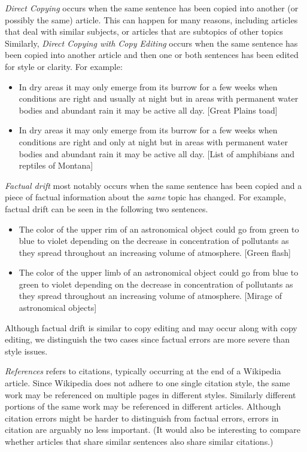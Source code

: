 \documentclass{acm_proc_article-sp}
\begin{document}
\emph{Direct Copying} occurs when the same sentence has been copied into another (or possibly the same) article. This can happen for many reasons, including articles that deal with similar subjects, or articles that are subtopics of other topics Similarly, \emph{Direct Copying with Copy Editing} occurs when the same sentence has been copied into another article and then one or both sentences has been edited for style or clarity. For example:
\begin{itemize}[noitemsep,nolistsep]
\item In dry areas it may only emerge from its burrow for a few weeks when conditions are right and usually at night but in areas with permanent water bodies and abundant rain it may be active all day. [Great Plains toad]
\item In dry areas it may only emerge from its burrow for a few weeks when conditions are right and only at night but in areas with permanent water bodies and abundant rain it may be active all day. [List of amphibians and reptiles of Montana]
\end{itemize}

\emph{Factual drift} most notably occurs when the same sentence has been copied and a piece of factual information about the \emph{same} topic has changed. For example, factual drift can be seen in the following two sentences.
\begin{itemize}[noitemsep,nolistsep]
\item The color of the upper rim of an astronomical object could go from green to blue to violet depending on the decrease in concentration of pollutants as they spread throughout an increasing volume of atmosphere. [Green flash]
\item The color of the upper limb of an astronomical object could go from blue to green to violet depending on the decrease in concentration of pollutants as they spread throughout an increasing volume of atmosphere. [Mirage of astronomical objects]
\end{itemize}
Although factual drift is similar to copy editing and may occur along with copy editing, we distinguish the two cases since factual errors are more severe than style issues.

\emph{References} refers to citations, typically occurring at the end of a Wikipedia article. Since Wikipedia does not adhere to one single citation style, the same work may be referenced on multiple pages in different styles. Similarly different portions of the same work may be referenced in different articles. Although citation errors might be harder to distinguish from factual errors, errors in citation are arguably no less important. (It would also be interesting to compare whether articles that share similar sentences also share similar citations.) 
\end{document}
